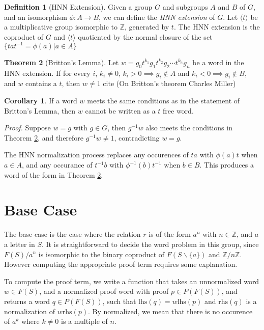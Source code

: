 \documentclass[11pt]{article} %
\theoremstyle{definition}
\newtheorem{theorem}{Theorem}[section]
\theoremstyle{definition}
\newtheorem{corol}{Corollary}[theorem]
\theoremstyle{definition}
\theoremstyle{definition}
\theoremstyle{definition}
\newtheorem{defn}[theorem]{Definition}
\theoremstyle{definition}
\begin{document}
\begin{defn}[HNN Extension]
  Given a group $G$ and subgroups $A$ and $B$ of $G$, and an isomorphism $\phi : A \to B$, we can define
  the \textit{HNN extension} of $G$. Let $\langle t \rangle$ be a multiplicative group isomorphic to
  $\mathbb{Z}$, generated by $t$. The HNN extension is the coproduct of $G$ and $\langle t \rangle$ quotiented
  by the normal closure of the set $\{ta t^{-1} = \phi(a) | a \in A\}$
\end{defn}

\begin{theorem}[Britton's Lemma]\label{britton}
  Let $w = g_0t^{k_1}g_1t^{k_2}g_2 \cdots t^{k_n}g_n$ be a word in the HNN extension.
  If for every $i$, $k_i \ne 0$, $k_i > 0 \implies g_i \notin A$ and $k_i < 0 \implies g_i \notin B$,
  and $w$ contains a $t$, then $w \ne 1$
  cite (On Britton's theorem Charles Miller)
\end{theorem}

\begin{corol}\label{genbritton}
  If a word $w$ meets the same conditions as in the statement of Britton's Lemma,
  then $w$ cannot be written as a $t$ free word.
\end{corol}

\textit{Proof.} Suppose $w = g$ with $g \in G$, then $g^{-1}w$ also meets the conditions
in Theorem \ref{britton}, and therefore $g^{-1}w \ne 1$, contradicting $w = g$.

The HNN normalization process replaces any occurences of $ta$ with $\phi(a)t$ when $a \in A$, and
any occurance of $t^{-1}b$ with $\phi^{-1}(b)t^{-1}$ when $b \in B$. This produces a word of
the form in Theorem \ref{britton}.

\section{Base Case}

The base case is the case where the relation $r$ is of the form $a^n$ with
$n \in \mathbb{Z}$, and $a$ a letter in $S$. It is straightforward to decide
the word problem in this group, since $F(S) / a^n$ is isomorphic
to the binary coproduct of $F(S \backslash \{a\})$ and $\mathbb{Z}/n\mathbb{Z}$.
However computing the appropriate proof term requires some explanation.

To compute the proof term, we write a function that takes an unnormalized word
$w \in F(S)$, and a normalized proof word with proof $p \in P(F(S))$, and returns
a word $q \in P(F(S))$, such that $\text{lhs}(q) = w\text{lhs}(p)$ and
$\text{rhs}(q)$ is a normalization of $w \text{rhs}(p)$. By normalized,
we mean that there is no occurence of $a^k$ where $k \ne 0$ is a multiple of $n$.
\end{document}
